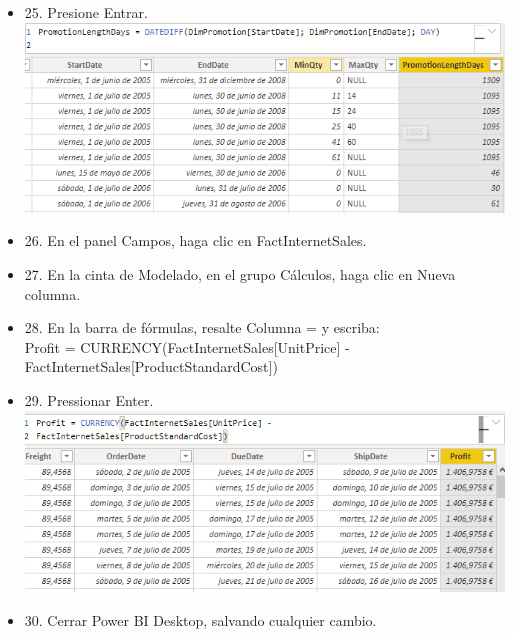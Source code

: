\begin{itemize}
\item 25. Presione Entrar.\\
\includegraphics[scale=0.5]{./Imagenes/image026}
\item 26. En el panel Campos, haga clic en FactInternetSales.
\item 27. En la cinta de Modelado, en el grupo Cálculos, haga clic en Nueva columna.
\item 28. En la barra de fórmulas, resalte Columna = y escriba:\\
Profit = CURRENCY(FactInternetSales[UnitPrice] - \\
FactInternetSales[ProductStandardCost])\\
\item 29. Pressionar Enter.\\
\includegraphics[scale=0.5]{./Imagenes/image027}
\item 30. Cerrar Power BI Desktop, salvando cualquier cambio.

\end{itemize}